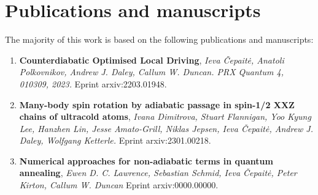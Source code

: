 \chapter{Publications and manuscripts}

The majority of this work is based on the following publications and manuscripts:

\begin{enumerate}
    \item \textbf{Counterdiabatic Optimised Local Driving}, \textit{Ieva Čepaitė, Anatoli Polkovnikov, Andrew J. Daley, Callum W. Duncan. PRX Quantum 4, 010309, 2023.} Eprint arxiv:2203.01948.
    \item \textbf{Many-body spin rotation by adiabatic passage in
    spin-1/2 XXZ chains of ultracold atoms}, \textit{Ivana Dimitrova, Stuart Flannigan, Yoo Kyung Lee, Hanzhen Lin,  Jesse Amato-Grill, Niklas Jepsen, Ieva Čepaitė, Andrew J. Daley, Wolfgang Ketterle.} Eprint arxiv:2301.00218.
    \item \textbf{Numerical approaches for non-adiabatic terms in quantum annealing}, \textit{Ewen D. C. Lawrence, Sebastian Schmid, Ieva Čepaitė, Peter Kirton, Callum W. Duncan} Eprint arxiv:0000.00000.
    
    
\end{enumerate}